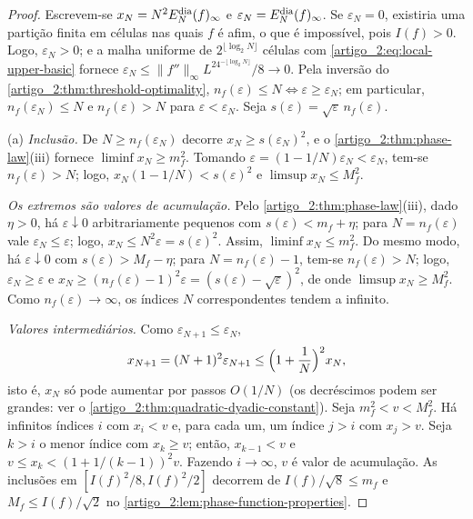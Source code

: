 \documentclass[12pt,a4paper]{article}
\theoremstyle{preciso}
\theoremstyle{definition}
\theoremstyle{preciso}
\theoremstyle{preciso}
\theoremstyle{preciso}
\theoremstyle{preciso}
\theoremstyle{definition}
\theoremstyle{preciso}
\theoremstyle{definition}
\theoremstyle{preciso}
\theoremstyle{preciso}
\theoremstyle{definition}
\begin{document}
\begin{proof}
Escrevem-se $x_N=N^2E_N^{\rm dia}(f)_\infty$ e $\varepsilon_N=E_N^{\rm dia}(f)_\infty$.
Se $\varepsilon_N=0$, existiria uma partição finita em células nas quais $f$ é afim,
o que é impossível, pois $I(f)>0$. Logo, $\varepsilon_N>0$; e a malha uniforme de $2^{\lfloor\log_2N\rfloor}$ células com
\eqref{artigo_2:eq:local-upper-basic} fornece
$\varepsilon_N\le\|f''\|_\infty L^24^{-\lfloor\log_2N\rfloor}/8\to0$.
Pela inversão do \cref{artigo_2:thm:threshold-optimality},
$n_f(\varepsilon)\le N\iff\varepsilon\ge\varepsilon_N$; em particular,
$n_f(\varepsilon_N)\le N$ e $n_f(\varepsilon)>N$ para $\varepsilon<\varepsilon_N$.
Seja $s(\varepsilon)=\sqrt\varepsilon\,n_f(\varepsilon)$.

(a) \emph{Inclusão.} De $N\ge n_f(\varepsilon_N)$ decorre $x_N\ge s(\varepsilon_N)^2$, e
o \cref{artigo_2:thm:phase-law}(iii) fornece $\liminf x_N\ge m_f^2$. Tomando
$\varepsilon=(1-1/N)\varepsilon_N<\varepsilon_N$, tem-se $n_f(\varepsilon)>N$; logo,
$x_N(1-1/N)<s(\varepsilon)^2$ e $\limsup x_N\le M_f^2$.

\emph{Os extremos são valores de acumulação.} Pelo
\cref{artigo_2:thm:phase-law}(iii), dado $\eta>0$, há $\varepsilon\downarrow0$
arbitrariamente pequenos com $s(\varepsilon)<m_f+\eta$; para $N=n_f(\varepsilon)$ vale
$\varepsilon_N\le\varepsilon$; logo, $x_N\le N^2\varepsilon=s(\varepsilon)^2$.
Assim, $\liminf x_N\le m_f^2$. Do mesmo modo, há $\varepsilon\downarrow0$ com
$s(\varepsilon)>M_f-\eta$; para $N=n_f(\varepsilon)-1$, tem-se $n_f(\varepsilon)>N$;
logo, $\varepsilon_N\ge\varepsilon$ e $x_N\ge(n_f(\varepsilon)-1)^2\varepsilon=(s(\varepsilon)-\sqrt\varepsilon)^2$,
de onde $\limsup x_N\ge M_f^2$. Como $n_f(\varepsilon)\to\infty$, os índices $N$
correspondentes tendem a infinito.

\emph{Valores intermediários.} Como $\varepsilon_{N+1}\le\varepsilon_N$,
\[
 x_{N+1}=(N+1)^2\varepsilon_{N+1}\le\Bigl(1+\frac1N\Bigr)^2x_N,
\]
isto é, $x_N$ só pode aumentar por passos $O(1/N)$ (os decréscimos podem ser
grandes: ver o \cref{artigo_2:thm:quadratic-dyadic-constant}). Seja
$m_f^2<v<M_f^2$. Há infinitos índices $i$ com $x_i<v$ e, para cada um, um
índice $j>i$ com $x_j>v$. Seja $k>i$ o menor índice com $x_k\ge v$; então,
$x_{k-1}<v$ e $v\le x_k<(1+1/(k-1))^2v$. Fazendo $i\to\infty$, $v$ é valor de
acumulação. As inclusões em $[I(f)^2/8,I(f)^2/2]$ decorrem de
$I(f)/\sqrt8\le m_f$ e $M_f\le I(f)/\sqrt2$ no
\cref{artigo_2:lem:phase-function-properties}.


\end{proof}
\end{document}
